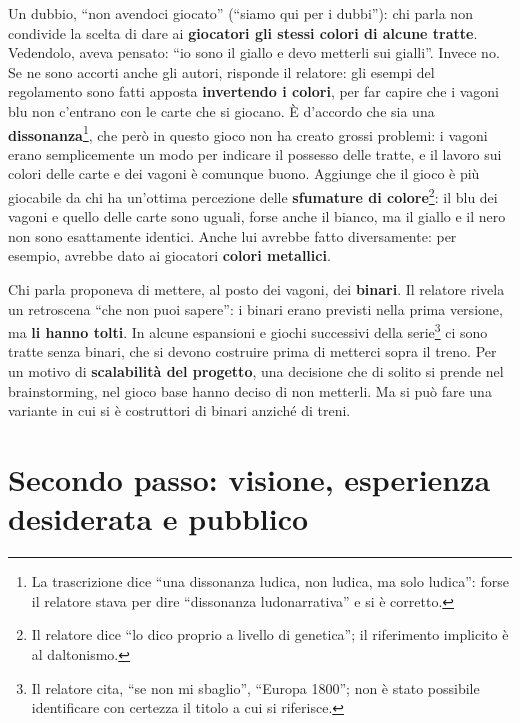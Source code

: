 Un dubbio, ``non avendoci giocato'' (``siamo qui per i dubbi''): chi parla
non condivide la scelta di dare ai \textbf{giocatori gli stessi colori di alcune
tratte}. Vedendolo, aveva pensato: ``io sono il giallo e devo metterli sui
gialli''. Invece no. Se ne sono accorti anche gli autori, risponde il relatore:
gli esempi del regolamento sono fatti apposta \textbf{invertendo i colori}, per
far capire che i vagoni blu non c'entrano con le carte che si giocano. È d'accordo
che sia una \textbf{dissonanza}\footnote{La trascrizione dice ``una dissonanza
ludica, non ludica, ma solo ludica'': forse il relatore stava per dire
``dissonanza ludonarrativa'' e si è corretto.}, che però in questo gioco non ha
creato grossi problemi: i vagoni erano semplicemente un modo per indicare il
possesso delle tratte, e il lavoro sui colori delle carte e dei vagoni è
comunque buono. Aggiunge che il gioco è più giocabile da chi ha un'ottima
percezione delle \textbf{sfumature di colore}\footnote{Il relatore dice ``lo dico
proprio a livello di genetica''; il riferimento implicito è al daltonismo.}: il
blu dei vagoni e quello delle carte sono uguali, forse anche il bianco, ma il
giallo e il nero non sono esattamente identici. Anche lui avrebbe fatto
diversamente: per esempio, avrebbe dato ai giocatori \textbf{colori metallici}.

Chi parla proponeva di mettere, al posto dei vagoni, dei
\textbf{binari}. Il relatore rivela un retroscena ``che non puoi sapere'': i
binari erano previsti nella prima versione, ma \textbf{li hanno tolti}. In alcune
espansioni e giochi successivi della serie\footnote{Il relatore cita, ``se non mi
sbaglio'', ``Europa 1800''; non è stato possibile identificare con certezza il
titolo a cui si riferisce.} ci sono tratte senza binari, che si devono costruire
prima di metterci sopra il treno. Per un motivo di \textbf{scalabilità del
progetto}, una decisione che di solito si prende nel brainstorming, nel gioco
base hanno deciso di non metterli. Ma si può fare una variante in cui si è
costruttori di binari anziché di treni.

\section{Secondo passo: visione, esperienza desiderata e pubblico}
\label{z7:sec:visione}


